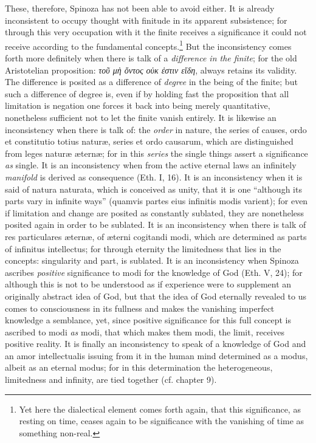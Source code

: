 \documentclass[12pt,a4paper,openany]{book}
\newcommand{\opage}[1]{\marginnote{\footnotesize\textit{[#1]}}}
\begin{document}
These, therefore, Spinoza has not been able to avoid either. It is already
inconsistent to occupy thought with finitude in its
apparent subsistence; for through this very occupation with it
the finite receives a significance it could not receive according to the fundamental
concepts.\footnote{Yet here the dialectical element comes forth again, that this
significance, as resting on time, ceases again to be significance with the vanishing of time
as something non-real.}
But the
inconsistency comes forth more definitely when there is talk of a \emph{difference in the
finite}; for the old Aristotelian proposition: \textit{τοῦ μὴ ὄντος
οὐκ ἐστιν εἴδη}, always retains its validity.
The difference is posited as a difference of \emph{degree} in the being of the finite; but
such a difference of degree is, even if by holding fast the proposition that
all limitation is negation one forces it back into being merely
quantitative, nonetheless sufficient not to let the finite
vanish entirely. It is likewise an inconsistency when there is talk
of: the \emph{order} in nature, the series of causes, ordo et constitutio totius %
naturæ, series et ordo causarum, which are distinguished from leges naturæ
æternæ; for in this \emph{series} the single things assert a significance \emph{as}
single. It is an inconsistency when from the active eternal laws
an infinitely \emph{manifold} is derived as consequence (Eth. I, 16). It is an
inconsistency when it is said of natura naturata, which is conceived as unity,
that it is one ``although its parts vary in infinite
ways'' (quamvis partes eius infinitis modis varient); for even if
limitation and change are posited as constantly sublated, they are nonetheless
posited again in order to be sublated. It is an inconsistency when there is talk of
res particulares æternæ, of æterni cogitandi modi, which are determined as
parts of infinitus intellectus; for through eternity the
limitedness that lies in the concepts: singularity and part, is sublated. It
is an inconsistency when
\opage{64}\setcounter{footnote}{0}Spinoza ascribes \emph{positive} significance to modi for the knowledge of
God (Eth. V, 24); for although this is not to be understood as if
experience were to supplement an originally abstract idea of God, but that the
idea of God eternally revealed to us comes to consciousness in its fullness and makes
the vanishing imperfect knowledge a semblance, yet, since
positive significance for this full concept is ascribed to modi \emph{as} modi,
that which makes them modi, the limit, receives positive reality. It is
finally an inconsistency to speak of a knowledge of God and an
amor intellectualis issuing from it in the human mind determined as a modus,
albeit as an eternal modus; for in this determination the
heterogeneous, limitedness and infinity, are tied together (cf. chapter 9).
\end{document}
